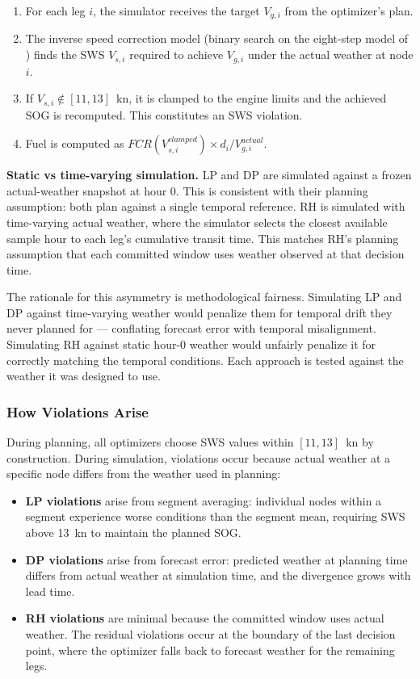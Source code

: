 \documentclass[review]{elsarticle}
\begin{document}
\begin{enumerate}
    \item For each leg $i$, the simulator receives the target $V_{g,i}$ from the optimizer's plan.
    \item The inverse speed correction model (binary search on the eight-step model of \cite{Yang2020}) finds the SWS $V_{s,i}$ required to achieve $V_{g,i}$ under the actual weather at node $i$.
    \item If $V_{s,i} \notin [11, 13]$~kn, it is clamped to the engine limits and the achieved SOG is recomputed. This constitutes an SWS violation.
    \item Fuel is computed as $FCR(V_{s,i}^{clamped}) \times d_i / V_{g,i}^{actual}$.
\end{enumerate}

\textbf{Static vs time-varying simulation.} LP and DP are simulated against a frozen actual-weather snapshot at hour 0. This is consistent with their planning assumption: both plan against a single temporal reference. RH is simulated with time-varying actual weather, where the simulator selects the closest available sample hour to each leg's cumulative transit time. This matches RH's planning assumption that each committed window uses weather observed at that decision time.

The rationale for this asymmetry is methodological fairness. Simulating LP and DP against time-varying weather would penalize them for temporal drift they never planned for --- conflating forecast error with temporal misalignment. Simulating RH against static hour-0 weather would unfairly penalize it for correctly matching the temporal conditions. Each approach is tested against the weather it was designed to use.

\subsubsection{How Violations Arise}

During planning, all optimizers choose SWS values within $[11, 13]$~kn by construction. During simulation, violations occur because actual weather at a specific node differs from the weather used in planning:

\begin{itemize}
    \item \textbf{LP violations} arise from segment averaging: individual nodes within a segment experience worse conditions than the segment mean, requiring SWS above 13~kn to maintain the planned SOG.
    \item \textbf{DP violations} arise from forecast error: predicted weather at planning time differs from actual weather at simulation time, and the divergence grows with lead time.
    \item \textbf{RH violations} are minimal because the committed window uses actual weather. The residual violations occur at the boundary of the last decision point, where the optimizer falls back to forecast weather for the remaining legs.
\end{itemize}
\end{document}
